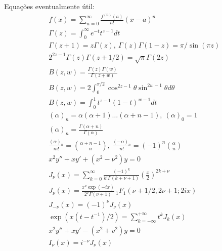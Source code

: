 \documentclass[a4paper,12pt, leqno, answers]{exam}
\begin{document}
\thispagestyle{empty}

\newpage
\setcounter{page}{1}
Equa\c{c}\~{o}es eventualmente útil:
\begin{align}
    & f(x) = \sum_{n = 0}^\infty \frac{f^{(n)}(a)}{n!} (x - a)^n \tag{ST} \label{eq:ser_taylor} \\
    & \Gamma(z) = \int_0^\infty e^{-t} t^{z - 1} dt \tag{GE} \label{eq:gamma_euler} \\
    & \Gamma(z + 1) = z \Gamma(z), \ \Gamma(z) \Gamma(1 - z) = \pi / \sin(\pi z) \label{eq:gamma_rel} \\
    & 2^{2 z - 1} \Gamma(z) \Gamma(z + 1/2) = \sqrt{\pi} \Gamma(2 z) \label{eq:gamma_dup_legendre} \\
    & B(z, w) = \frac{\Gamma(z) \Gamma(w)}{\Gamma(z + w)} \tag{BG} \label{eq:beta} \\
    & B(z, w) = 2 \int_0^{\pi / 2} \cos^{2z - 1} \theta \sin^{2w - 1} \theta d\theta \tag{BT} \label{eq:beta_trig} \\
    & B(z, w) = \int_0^1 t^{z - 1} (1 - t)^{w - 1} dt \tag{BI} \label{eq:beta_int} \\
    & (\alpha)_n = \alpha (\alpha + 1) \ldots (\alpha + n - 1), \ (\alpha)_0 = 1 \tag{SP} \label{eq:sim_poch} \\
    & (\alpha)_n = \frac{\Gamma(\alpha + n)}{\Gamma(\alpha)} \label{eq:sim_poch_gamma} \\
    & \frac{(\alpha)_n}{m!} = \binom{\alpha + n - 1}{n}, \ \frac{(-\alpha)_n}{n!} = (-1)^n \binom{\alpha}{n} \label{eq:sim_poch_binom} \\
    & x^2 y'' + x y' + (x^2 - \nu^2) y = 0 \tag{EB} \label{eq:bessel} \\
    & J_\nu(x) = \sum_{k = 0}^\infty \frac{(-1)^k}{k! \Gamma(k + \nu + 1)} \left( \frac{x}{2} \right)^{2k + \nu} \label{eq:bessel_pri_esp} \\
    & J_\nu(x) = \frac{x^\nu \exp(-i x)}{2^\nu \Gamma(\nu + 1)} \,_1F_1(\nu + 1/2, 2\nu + 1; 2 i x) \label{eq:bessel_pri_esp_hiperg_con} \\
    & J_{-\nu}(x) = (-1)^\nu J_\nu(x) \label{eq:bessel_prim_esp_neg} \\
    & \exp(x (t - t^{-1}) / 2) = \sum_{k = -\infty}^{+\infty} t^k J_k(x) \tag{GFB} \label{eq:bessel_pri_esp_geratriz} \\
    & x^2 y'' + x y' - (x^2 + v^2) y = 0 \tag{EBM} \label{eq:bessel_mod} \\
    & I_\nu(x) = i^{-\nu} J_\nu(x) \label{eq:bessel_mod_pri_esp}

\end{align}
\end{document}
